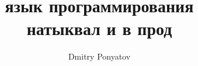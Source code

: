 
\title{язык программирования \T\\натыквал и в прод}
\author{Dmitry Ponyatov }

\maketitle
\tableofcontents




